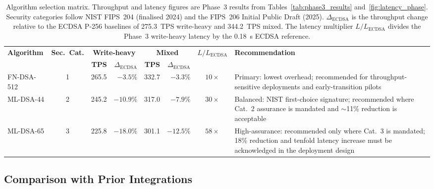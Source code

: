 \documentclass{ieeetj}
\begin{document}
\begin{table}[ht]
\centering
\caption{Algorithm selection matrix. Throughput and latency figures are
Phase~3 results from Tables~\ref{tab:phase3_results}
and~\ref{fig:latency_phase}. Security categories follow NIST FIPS~204
(finalised 2024) and the FIPS~206 Initial Public Draft (2025). $\Delta_{\mathrm{ECDSA}}$
is the throughput change relative to the ECDSA P-256 baselines of 275.3~TPS
write-heavy and 344.2~TPS mixed. The latency multiplier $L/L_{\mathrm{ECDSA}}$
divides the Phase~3 write-heavy latency by the 0.18~s ECDSA reference.}
\label{tab:selection_matrix}
\setlength{\tabcolsep}{3pt}
\footnotesize
\begin{tabular}{@{}lcrrrrcp{3.4cm}@{}}
\toprule
\textbf{Algorithm} & \textbf{Sec.\ Cat.} &
\multicolumn{2}{c}{\textbf{Write-heavy}} &
\multicolumn{2}{c}{\textbf{Mixed}} &
\textbf{$L/L_{\mathrm{ECDSA}}$} &
\textbf{Recommendation} \\
\cmidrule(lr){3-4}\cmidrule(lr){5-6}
& & \textbf{TPS} & \textbf{$\Delta_{\mathrm{ECDSA}}$} &
\textbf{TPS} & \textbf{$\Delta_{\mathrm{ECDSA}}$} & & \\
\midrule
FN-DSA-512 & 1 & 265.5 & $-3.5\%$  & 332.7 & $-3.3\%$  & $10\times$  & Primary: lowest overhead; recommended for throughput-sensitive deployments and early-transition pilots \\
ML-DSA-44  & 2 & 245.2 & $-10.9\%$ & 317.0 & $-7.9\%$  & $30\times$  & Balanced: NIST first-choice signature; recommended where Cat.~2 assurance is mandated and $\sim$11\% reduction is acceptable \\
ML-DSA-65  & 3 & 225.8 & $-18.0\%$ & 301.1 & $-12.5\%$ & $58\times$  & High-assurance: recommended only where Cat.~3 is mandated; 18\% reduction and tenfold latency increase must be acknowledged in the deployment design \\
\bottomrule
\end{tabular}
\end{table}

\subsection{Comparison with Prior Integrations}
\label{sec:res_comparison}
\end{document}
